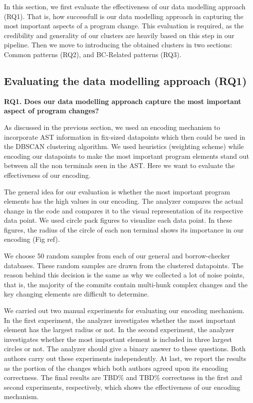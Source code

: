 In this section, we first evaluate the effectiveness of our data modelling approach (RQ1). That is, how successfull is our data modelling approach in capturing the most important aspects of a program change. This evaluation is required, as the credibility and generality of our clusters are heavily based on this step in our pipeline. Then we move to introducing the obtained clusters in two sections: Common patterns (RQ2), and BC-Related patterns (RQ3).

\subsection{Evaluating the data modelling approach (RQ1)}

\textbf{RQ1. Does our data modelling approach capture the most important aspect of program changes?} 

As discussed in the previous section, we used an encoding mechanism to incorporate AST information in fix-sized datapoints which then could be used in the DBSCAN clustering algorithm. We used heuristics (weighting scheme) while encoding our datapoints to make the most important program elements stand out between all the non terminals seen in the AST. Here we want to evaluate the effectiveness of our encoding.

The general idea for our evaluation is whether the most important program elements has the high values in our encoding. The analyzer compares the actual change in the code and compares it to the visual representation of its respective data point. We used circle pack figures to visualize each data point. In these figures, the radius of the circle of each non terminal shows its importance in our encoding (Fig ref).

We choose 50 random samples from each of our general and borrow-checker databases. These random samples are drawn from the clustered datapoints. The reason behind this decision is the same as why we collected a lot of noise points, that is, the majority of the commits contain multi-hunk complex changes and the key changing elements are difficult to determine.

We carried out two manual experiments for evaluating our encoding mechanism. In the first experiment, the analyzer investigates whether the most important element has the largest radius or not. In the second experiment, the analyzer investigates whether the most important element is included in three largest circles or not. The analyzer should give a binary answer to these questions. Both authors carry out these experiments independently. At last, we report the results as the portion of the changes which both authors agreed upon its encoding correctness. The final results are TBD\% and TBD\% correctness in the first and second experiments, respectively, which shows the effectiveness of our encoding mechanism.

